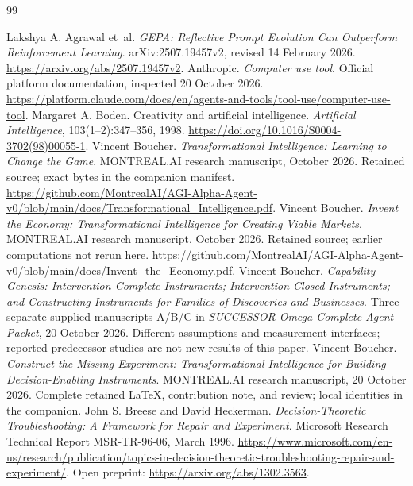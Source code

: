 \documentclass[11pt,letterpaper]{article}
\theoremstyle{remark}\newtheorem{remark}{Remark}[section]
\begin{document}
\par\bigskip
\begin{thebibliography}{99}
\footnotesize\raggedright\setlength{\itemsep}{.10em}\setlength{\parsep}{0pt}
Lakshya A. Agrawal et~al. \emph{GEPA: Reflective Prompt Evolution Can Outperform Reinforcement Learning}. arXiv:2507.19457v2, revised 14 February 2026. \url{https://arxiv.org/abs/2507.19457v2}.
Anthropic. \emph{Computer use tool}. Official platform documentation, inspected 20 October 2026. \url{https://platform.claude.com/docs/en/agents-and-tools/tool-use/computer-use-tool}.
Margaret A. Boden. Creativity and artificial intelligence. \emph{Artificial Intelligence}, 103(1--2):347--356, 1998. \url{https://doi.org/10.1016/S0004-3702(98)00055-1}.
Vincent Boucher. \emph{Transformational Intelligence: Learning to Change the Game}. MONTREAL.AI research manuscript, October 2026. Retained source; exact bytes in the companion manifest. \url{https://github.com/MontrealAI/AGI-Alpha-Agent-v0/blob/main/docs/Transformational_Intelligence.pdf}.
Vincent Boucher. \emph{Invent the Economy: Transformational Intelligence for Creating Viable Markets}. MONTREAL.AI research manuscript, October 2026. Retained source; earlier computations not rerun here. \url{https://github.com/MontrealAI/AGI-Alpha-Agent-v0/blob/main/docs/Invent_the_Economy.pdf}.
Vincent Boucher. \emph{Capability Genesis: Intervention-Complete Instruments; Intervention-Closed Instruments; and Constructing Instruments for Families of Discoveries and Businesses}. Three separate supplied manuscripts A/B/C in \emph{SUCCESSOR Omega Complete Agent Packet}, 20 October 2026. Different assumptions and measurement interfaces; reported predecessor studies are not new results of this paper.
Vincent Boucher. \emph{Construct the Missing Experiment: Transformational Intelligence for Building Decision-Enabling Instruments}. MONTREAL.AI research manuscript, 20 October 2026. Complete retained LaTeX, contribution note, and review; local identities in the companion.
John S. Breese and David Heckerman. \emph{Decision-Theoretic Troubleshooting: A Framework for Repair and Experiment}. Microsoft Research Technical Report MSR-TR-96-06, March 1996. \url{https://www.microsoft.com/en-us/research/publication/topics-in-decision-theoretic-troubleshooting-repair-and-experiment/}. Open preprint: \url{https://arxiv.org/abs/1302.3563}.

\end{thebibliography}
\end{document}
